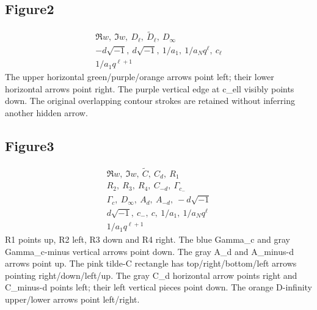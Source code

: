 \documentclass[11pt]{article}
\numberwithin{equation}{section}
\numberwithin{equation}{section}
\begin{document}
\subsection*{Figure2}
\[\begin{gathered}\Re w,\ \Im w,\ D_\ell,\ \tilde D_\ell,\ D_\infty\\
-d\sqrt{-1},\ d\sqrt{-1},\ 1/a_1,\ 1/a_Nq^\ell,\ c_\ell\\
1/a_1q^{\ell+1}\end{gathered}\]
\noindent The upper horizontal green/purple/orange arrows point left; their lower horizontal arrows point right. The purple vertical edge at c\_ell visibly points down. The original overlapping contour strokes are retained without inferring another hidden arrow.\par
\subsection*{Figure3}
\[\begin{gathered}\Re w,\ \Im w,\ \tilde C,\ C_d,\ R_1\\
R_2,\ R_3,\ R_4,\ C_{-d},\ \Gamma_{c_-}\\
\Gamma_c,\ D_\infty,\ A_d,\ A_{-d},\ -d\sqrt{-1}\\
d\sqrt{-1},\ c_-,\ c,\ 1/a_1,\ 1/a_Nq^\ell\\
1/a_1q^{\ell+1}\end{gathered}\]
\noindent R1 points up, R2 left, R3 down and R4 right. The blue Gamma\_c and gray Gamma\_c-minus vertical arrows point down. The gray A\_d and A\_minus-d arrows point up. The pink tilde-C rectangle has top/right/bottom/left arrows pointing right/down/left/up. The gray C\_d horizontal arrow points right and C\_minus-d points left; their left vertical pieces point down. The orange D-infinity upper/lower arrows point left/right.\par
\end{document}
